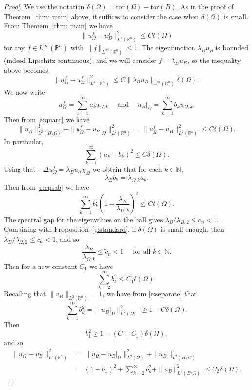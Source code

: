 \documentclass[10pt,a4paper]{amsart}
\numberwithin{equation}{section}
\def\R{{\mathbb R}}
\def\W{\Omega}
\def\tor{\mathrm{tor}}
\begin{document}
\begin{proof}
We use the notation $\delta(\W)=\tor(\W)-\tor(B)$. 
As in the proof of Theorem~\ref{thm: main} above, it suffices to consider the case when $\delta(\W)$ is small.
From Theorem~\ref{thm: main} we have 
\[
 \| u_{\W}^f - u_{B}^f \|^2_{L^2(\mathbb{R}^n)} \leq C \delta(\W)
\]
 for any $f \in {L^\infty}(\R^n)$ with $\| f\|_{{L^\infty}(\R^n)} \leq 1.$
The eigenfunction $\lambda_B u_B$ is {bounded} (indeed Lipschitz continuous), and we will consider $f=\lambda_B u_{B}$, so the inequality above becomes 
\begin{equation} \label{e:quant}
 \| u_{\W}^f - u_{B}^f \|^2_{L^2(\mathbb{R}^n)} \leq C \|\lambda_B u_B \|_{L^{\infty}(\mathbb{R}^n)} \delta(\W)\,.
\end{equation}
We now write 
\[
u_{\W}^f = \sum_{k=1}^{\infty} a_k u_{\W,k}
\quad \text{ and } \quad  
u_{B}\big|_{\W} = \sum_{k=1}^{\infty} b_k u_{\W,k}. 
\]
Then from \eqref{e:quant} we have 
\begin{equation} \label{e:separate}
  \|u_B \|^2_{L^2(B \setminus \W)} +  \| u_{\W}^f - u_{B}\big|_{\W} \|^2_{L^2(\mathbb{R}^n)} =   \| u_{\W}^f - u_{B} \|^2_{L^2(\mathbb{R}^n)} \leq C \delta(\W). 
\end{equation}
 In particular, 
\begin{equation} \label{e:epsab}
    \sum_{k=1}^{\infty} (a_k - b_k)^2 \leq C \delta(\W). 
\end{equation}
Using that $-\Delta u_{\W}^f = \lambda_B u_B \chi_{\W}$ we obtain that for each $k \in \mathbb{N}$,
\[
\lambda_B b_k = \lambda_{\W,k} a_k.  
\]
Then from \eqref{e:epsab} we have 
\[
\sum_{k=1}^{\infty} b_k^2 \left(1- \frac{\lambda_B}{\lambda_{\W,k}} \right)^2 \leq C \delta(\W). 
\]
The spectral gap for the eigenvalues on the ball gives $\lambda_{B}/\lambda_{B,2} \leq c_n <1$. Combining with Proposition~\ref{p:standard}, if $\delta(\W)$ is small enough, then 
$\lambda_{B}/\lambda_{\Omega,2} \leq \tilde{c}_n <1$, and so 
\[
  \frac{\lambda_{B}}{\lambda_{\Omega,k}} \leq \tilde{c}_n <1 \quad \text{ for all } k \in \mathbb{N}. 
\]
Then for a new constant $C_1$ we have 
\[
\sum_{k=2}^{\infty} b_k^2 \leq C_1 \delta(\W). 
\]
Recalling that $\|u_B\|_{L^2(\mathbb{R}^n)}=1$, we have from \eqref{e:separate} that
\[
\sum_{k=1}^{\infty} b_k^2 = \| u_B \big|_\W \|^2_{L^2(\W)} \geq 1 - C\delta(\W). 
\]
Then 
\[
b_1^2 \geq 1 - (C+C_1) \delta(\W),
\]
and so 
\[
\begin{aligned}
\| u_{\W} - u_B \|_{L^2(\mathbb{R}^n)}^2 
&=\| u_{\W} - u_B \big|_{\W} \|_{L^2(\W)}^2 + \|u_B \|^2_{L^2(B \setminus \W)} \\
&=(1-b_1)^2 + \sum_{k=2}^{\infty} b_k^2 + \|u_B \|^2_{L^2(B \setminus \W)} \leq C_2 \delta(\W). 
\end{aligned}
\]
\end{proof}
\end{document}
